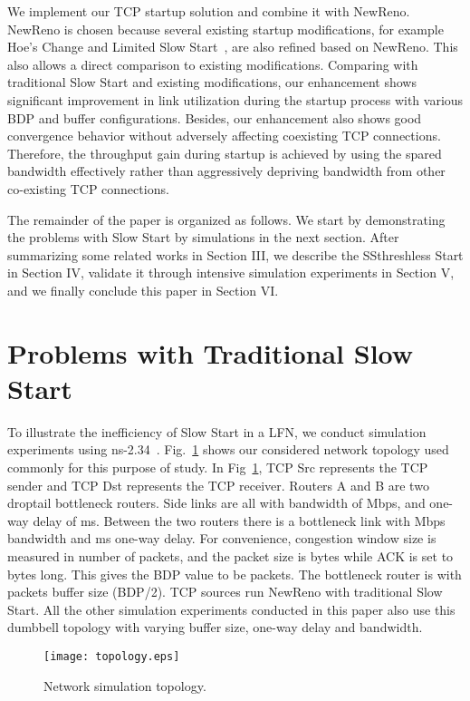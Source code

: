 \documentclass[12pt,onecolumn]{IEEEtran}
\begin{document}
We implement our TCP startup solution and combine it with NewReno. NewReno is
chosen because several existing startup modifications, for example Hoe's Change
\cite{hoe} and Limited Slow Start~\cite{limited}, are also refined based on
NewReno. This also allows a direct comparison to existing modifications.
Comparing with traditional Slow Start and existing modifications, our
enhancement shows significant improvement in link utilization during the
startup process with various BDP and buffer configurations. Besides, our
enhancement also shows good convergence behavior without adversely affecting
coexisting TCP connections. Therefore, the throughput gain during startup is
achieved by using the spared bandwidth effectively rather than aggressively
depriving bandwidth from other co-existing TCP connections.

The remainder of the paper is organized as follows. We start by demonstrating
the problems with Slow Start by simulations in the next section. After
summarizing some related works in Section III, we describe the SSthreshless
Start in Section IV, validate it through intensive simulation experiments in
Section V, and we finally conclude this paper in Section VI.


\section{Problems with Traditional Slow Start}

To illustrate the inefficiency of Slow Start in a LFN, we conduct simulation
experiments using ns-2.34~\cite{NS}. Fig.~\ref{fig_topology} shows our
considered network topology used commonly for this purpose of study. In
Fig~\ref{fig_topology}, TCP Src represents the TCP sender and TCP Dst
represents the TCP receiver. Routers A and B are two droptail bottleneck
routers. Side links are all with bandwidth of  Mbps, and one-way delay of
 ms. Between the two routers there is a bottleneck link with  Mbps
bandwidth and  ms one-way delay. For convenience, congestion window size is measured
in number of packets, and the packet size is  bytes while ACK is set to
 bytes long. This gives the BDP value to be  packets. The bottleneck
router is with  packets buffer size (BDP/2). TCP sources run NewReno with
traditional Slow Start. All the other simulation experiments conducted in this
paper also use this dumbbell topology with varying buffer size, one-way delay
and bandwidth.


\begin{figure}[t]
\centering
\texttt{[image: topology.eps]}
\caption{Network simulation topology.} \label{fig_topology}
\end{figure}
\end{document}
